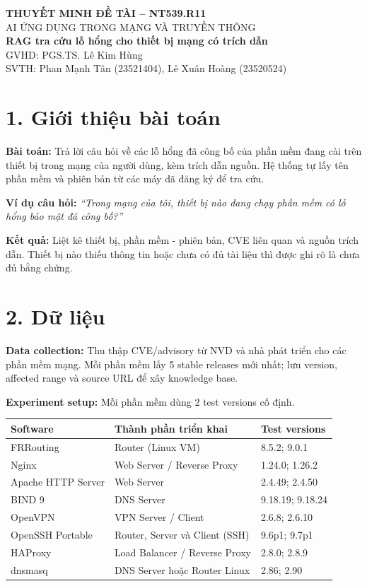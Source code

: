 \documentclass[11pt,a4paper]{article}
\renewcommand{\arraystretch}{1.10}
\newenvironment{flow}{\par\vspace{2pt}\begingroup\centering\small}{\par\endgroup\vspace{2pt}}
\begin{document}
\begin{center}
    {\normalsize\bfseries THUYẾT MINH ĐỀ TÀI -- NT539.R11}\\[-1pt]
    {\small AI ỨNG DỤNG TRONG MẠNG VÀ TRUYỀN THÔNG}\\[2pt]
    {\bfseries RAG tra cứu lỗ hổng cho thiết bị mạng có trích dẫn}\\[2pt]
    {\small GVHD: PGS.TS. Lê Kim Hùng\\
    SVTH: Phan Mạnh Tân (23521404), Lê Xuân Hoàng (23520524)}
\end{center}
\vspace{-8pt}

\section*{1. Giới thiệu bài toán}

\textbf{Bài toán:} Trả lời câu hỏi về các lỗ hổng đã công bố của phần mềm đang cài trên thiết bị trong mạng của người dùng, kèm trích dẫn nguồn. Hệ thống tự lấy tên phần mềm và phiên bản từ các máy đã đăng ký để tra cứu.

\textbf{Ví dụ câu hỏi:} \emph{“Trong mạng của tôi, thiết bị nào đang chạy phần mềm có lỗ hổng bảo mật đã công bố?”}

\textbf{Kết quả:} Liệt kê thiết bị, phần mềm - phiên bản, CVE liên quan và nguồn trích dẫn. Thiết bị nào thiếu thông tin hoặc chưa có đủ tài liệu thì được ghi rõ là chưa đủ bằng chứng.

\section*{2. Dữ liệu}

\textbf{Data collection:} Thu thập CVE/advisory từ NVD và nhà phát triển cho các phần mềm mạng. Mỗi phần mềm lấy 5 stable releases mới nhất; lưu version, affected range và source URL để xây knowledge base.

\textbf{Experiment setup:} Mỗi phần mềm dùng 2 test versions cố định.
\begin{flow}
\renewcommand{\arraystretch}{1.18}
\begin{tabularx}{\linewidth}{@{}p{4.1cm}Yp{4.0cm}@{}}
\toprule
{}
\textbf{Software} & \textbf{Thành phần triển khai} & \textbf{Test versions}\\
\midrule
FRRouting & Router (Linux VM) & 8.5.2; 9.0.1\\
Nginx & Web Server / Reverse Proxy & 1.24.0; 1.26.2\\
Apache HTTP Server & Web Server & 2.4.49; 2.4.50\\
BIND 9 & DNS Server & 9.18.19; 9.18.24\\
OpenVPN & VPN Server / Client & 2.6.8; 2.6.10\\
OpenSSH Portable & Router, Server và Client (SSH) & 9.6p1; 9.7p1\\
HAProxy & Load Balancer / Reverse Proxy & 2.8.0; 2.8.9\\
dnsmasq & DNS Server hoặc Router Linux & 2.86; 2.90\\
\bottomrule
\end{tabularx}
\end{flow}
\end{document}
